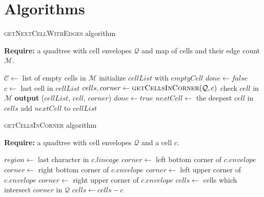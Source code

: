 \documentclass{article}
\begin{document}
    
    \section*{Algorithms}
    \begin{algorithm} \caption{\textsc{getNextCellWithEdges} algorithm}
        \textbf{Require:} a quadtree with cell envelopes $\mathcal Q$ and map of cells and their edge count $\mathcal M$.
        \begin{algorithmic}[1]
            \State $\mathcal C \gets $ list of empty cells in $\mathcal M$
                \State initialize $cellList$ with $emptyCell$ 
                \State $done \gets false$
                \Repeat
                    \State $c \gets $ last cell in $cellList$ 
                    \State $cells, corner \gets \textsc{getCellsInCorner}(\mathcal Q, c)$ 
                        \State check $cell$ in $\mathcal M$ 
                            \State \textbf{output} ($cellList$, $cell$, $corner$)
                            \State $done \gets true$
                        \EndIf
                    \EndFor
                        \State $nextCell \gets$ the deepest $cell$ in $cells$ 
                        \State add $nextCell$ to $cellList$
                    \EndIf
            \EndFor
        \EndFunction
        \end{algorithmic}
    \end{algorithm}
    
    \begin{algorithm} \caption{\textsc{getCellsInCorner} algorithm}
        \textbf{Require:} a quadtree with cell envelopes $\mathcal Q$ and a cell $c$.
        \begin{algorithmic}[1]
            \State $region \gets $ last character in $c.lineage$
                    \State $corner \gets$ left bottom corner of $c.envelope$
                \EndCase
                    \State $corner \gets$ right bottom corner of $c.envelope$
                \EndCase
                    \State $corner \gets$ left upper corner of $c.envelope$
                \EndCase
                    \State $corner \gets$ right upper corner of $c.envelope$
                \EndCase
            \EndSwitch
            \State $cells \gets$ cells which intersect $corner$ in $\mathcal Q$
            \State $cells \gets cells - c$ 
            \State {}
        \EndFunction
        \end{algorithmic}
    \end{algorithm}
\end{document}
